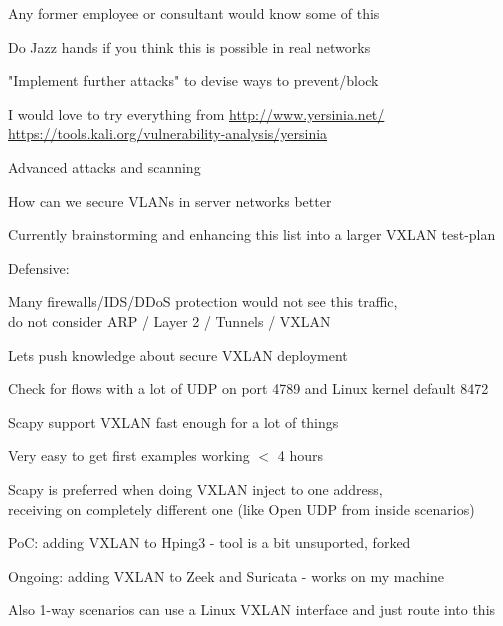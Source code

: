 \documentclass[Screen16to9,17pt]{foils}
\begin{document}
\vskip 1cm
Any former employee or consultant would know some of this

Do Jazz hands if you think this is possible in real networks




\begin{list2}
\item "Implement further attacks" to devise ways to prevent/block
\item I would love to try everything from  \url{http://www.yersinia.net/}\\ \url{https://tools.kali.org/vulnerability-analysis/yersinia}
\item Advanced attacks and scanning
\item How can we secure VLANs in server networks better
\item Currently brainstorming and enhancing this list into a larger VXLAN test-plan
\end{list2}



Defensive:
\begin{list2}
\item Many firewalls/IDS/DDoS protection would not see this traffic,\\
do not consider ARP / Layer 2 / Tunnels / VXLAN
\item Lets push knowledge about secure VXLAN deployment
\item Check for flows with a lot of UDP on port 4789 and Linux kernel default 8472
\end{list2}


\begin{list2}
\item Scapy support VXLAN fast enough for a lot of things
\item Very easy to get first examples working $<$ 4 hours
\item Scapy is preferred when doing VXLAN inject to one address, \\
receiving on completely different one (like Open UDP from inside scenarios)
\item PoC: adding VXLAN to Hping3 - tool is a bit unsuported, forked
\item Ongoing: adding VXLAN to Zeek and Suricata - works on my machine
\vskip 1cm
\item Also 1-way scenarios can use a Linux VXLAN interface and just route into this
\end{list2}
\end{document}
